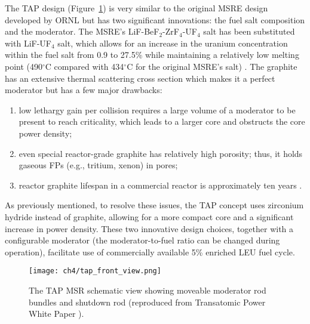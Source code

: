 The \gls{TAP} design (Figure~\ref{fig:tap-side-view}) is very similar to the
original \gls{MSRE} design developed by \gls{ORNL} 
\cite{haubenreich_experience_1970} but has two significant innovations: 
the fuel salt composition and the moderator. The \gls{MSRE}'s 
LiF-BeF$_2$-ZrF$_4$-UF$_4$ salt has been substituted with LiF-UF$_4$ salt, 
which allows for an increase in the uranium concentration within the fuel salt 
from 0.9 to 27.5\% while maintaining a relatively low melting point 
(490$^{\circ}$C compared with 434$^{\circ}$C for the original \gls{MSRE}'s 
salt) \cite{betzler_two-dimensional_2017}. The graphite has an extensive 
thermal scattering cross section which makes it a perfect moderator but has 
a few major drawbacks: 
\begin{enumerate}[label=(\alph*), itemsep=-1ex]
	\item low lethargy gain per collision requires a large volume of a
	moderator to be present to reach criticality, which leads to a larger core 
	and obstructs the core power density;
	\item even special reactor-grade graphite has relatively high porosity; 
	thus, it holds gaseous \glspl{FP} (e.g., tritium, xenon) in pores;
	\item reactor graphite lifespan in a commercial reactor is 
	approximately ten years \cite{robertson_conceptual_1971}.
\end{enumerate}
As previously mentioned, to resolve these issues, the \gls{TAP} concept uses 
zirconium hydride instead of graphite, allowing for a more compact core and a 
significant increase in power density. These two innovative design choices, 
together with a configurable moderator (the moderator-to-fuel ratio can be 
changed during operation), facilitate use of commercially available 5\% 
enriched \gls{LEU} fuel cycle. 
\begin{figure}[h] %
	\hspace{+2.2in}
	\texttt{[image: ch4/tap\_front\_view.png]}
	\caption{The \gls{TAP} \gls{MSR} schematic view showing moveable moderator 
		rod bundles and shutdown rod (reproduced from Transatomic Power 
		White Paper \cite{transatomic_power_corporation_technical_2016}).}
	\label{fig:tap-side-view}
\end{figure}

